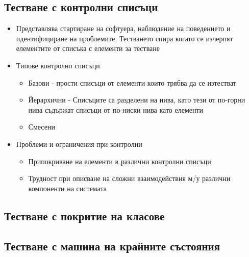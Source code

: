 \documentclass[fleqn,12pt]{article}
\begin{document}
\begin{flushleft}
    \subsection{Тестване с контролни списъци}
        \begin{itemize}
            \item Представлява стартиране на софтуера, наблюдение на поведението и идентифициране на проблемите. Тестването спира когато се изчерпят елементите от списъка с елементи за тестване
            \item Типове контролно списъци
                \begin{itemize}
                    \item Базови - прости списъци от елементи които трябва да се изтестват
                    \item Йерархични - Списъците са разделени на нива, като тези от по-горни нива съдържат списъци от по-ниски нива като елементи
                    \item Смесени
                \end{itemize}
            \item Проблеми и ограничения при контролни
                \begin{itemize}
                    \item Припокриване на елементи в различни контролни списъци
                    \item Трудност при описване на сложни взаимодействия м/у различни компоненти на системата
                \end{itemize}
        \end{itemize}
    \subsection{Тестване с покритие на класове}
    \subsection{Тестване с машина на крайните състояния}

\end{flushleft}
\end{document}
